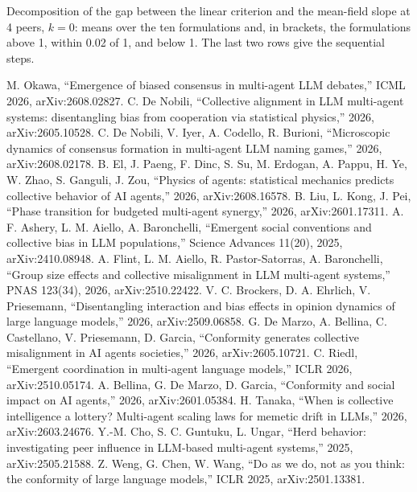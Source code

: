 \documentclass[11pt]{article}
\begin{document}
\begin{table}[htbp]
\centering
\caption{Decomposition of the gap between the linear criterion and the mean-field slope at 4 peers, $k=0$: means over the ten formulations and, in brackets, the formulations above 1, within 0.02 of 1, and below 1. The last two rows give the sequential steps.}
\label{tab:decomposition}
\small

\end{table}
\clearpage
\begin{thebibliography}{99}
 M. Okawa, ``Emergence of biased consensus in
multi-agent LLM debates,'' ICML 2026, arXiv:2608.02827.
 C. De Nobili, ``Collective alignment in LLM
multi-agent systems: disentangling bias from cooperation via statistical
physics,'' 2026, arXiv:2605.10528.
 C. De Nobili, V. Iyer, A. Codello, R. Burioni,
``Microscopic dynamics of consensus formation in multi-agent LLM naming
games,'' 2026, arXiv:2608.02178.
 B. El, J. Paeng, F. Dinc, S. Su, M. Erdogan, A. Pappu,
H. Ye, W. Zhao, S. Ganguli, J. Zou, ``Physics of agents: statistical
mechanics predicts collective behavior of AI agents,'' 2026,
arXiv:2608.16578.
 B. Liu, L. Kong, J. Pei, ``Phase transition for budgeted
multi-agent synergy,'' 2026, arXiv:2601.17311.
 A. F. Ashery, L. M. Aiello, A. Baronchelli,
``Emergent social conventions and collective bias in LLM populations,''
Science Advances 11(20), 2025, arXiv:2410.08948.
 A. Flint, L. M. Aiello, R. Pastor-Satorras,
A. Baronchelli, ``Group size effects and collective misalignment in LLM
multi-agent systems,'' PNAS 123(34), 2026, arXiv:2510.22422.
 V. C. Brockers, D. A. Ehrlich, V. Priesemann, ``Disentangling
interaction and bias effects in opinion dynamics of large language
models,'' 2026, arXiv:2509.06858.
 G. De Marzo, A. Bellina, C. Castellano, V. Priesemann,
D. Garcia, ``Conformity generates collective misalignment in AI agents
societies,'' 2026, arXiv:2605.10721.
 C. Riedl, ``Emergent coordination in multi-agent
language models,'' ICLR 2026, arXiv:2510.05174.
 A. Bellina, G. De Marzo, D. Garcia, ``Conformity and social
impact on AI agents,'' 2026, arXiv:2601.05384.
 H. Tanaka, ``When is collective intelligence a
lottery? Multi-agent scaling laws for memetic drift in LLMs,'' 2026,
arXiv:2603.24676.
 Y.-M. Cho, S. C. Guntuku, L. Ungar, ``Herd behavior: investigating peer
influence in LLM-based multi-agent systems,'' 2025, arXiv:2505.21588.
 Z. Weng, G. Chen, W. Wang, ``Do as we do, not as you think: the
conformity of large language models,'' ICLR 2025, arXiv:2501.13381.
\end{thebibliography}
\end{document}
